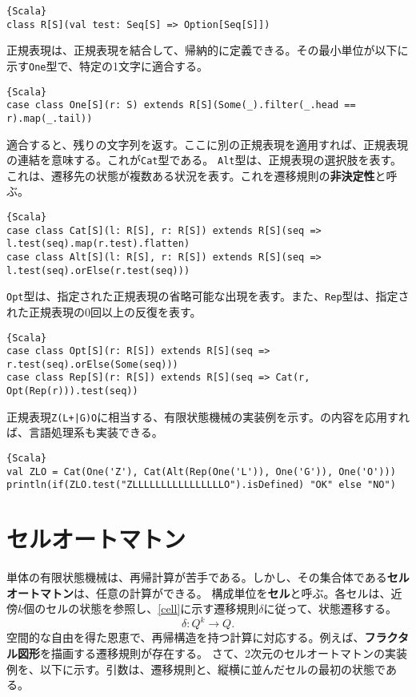 \documentclass[10pt,a4paper]{book}
\begin{document}
\begin{Verbatim}{Scala}
class R[S](val test: Seq[S] => Option[Seq[S]])
\end{Verbatim}

正規表現は、正規表現を結合して、帰納的に定義できる。その最小単位が以下に示す\texttt{One}型で、特定の1文字に適合する。

\begin{Verbatim}{Scala}
case class One[S](r: S) extends R[S](Some(_).filter(_.head == r).map(_.tail))
\end{Verbatim}

適合すると、残りの文字列を返す。ここに別の正規表現を適用すれば、正規表現の連結を意味する。これが\texttt{Cat}型である。
\texttt{Alt}型は、正規表現の選択肢を表す。これは、遷移先の状態が複数ある状況を表す。これを遷移規則の\textbf{非決定性}と呼ぶ。

\begin{Verbatim}{Scala}
case class Cat[S](l: R[S], r: R[S]) extends R[S](seq => l.test(seq).map(r.test).flatten)
case class Alt[S](l: R[S], r: R[S]) extends R[S](seq => l.test(seq).orElse(r.test(seq)))
\end{Verbatim}

\texttt{Opt}型は、指定された正規表現の省略可能な出現を表す。また、\texttt{Rep}型は、指定された正規表現の0回以上の反復を表す。

\begin{Verbatim}{Scala}
case class Opt[S](r: R[S]) extends R[S](seq => r.test(seq).orElse(Some(seq)))
case class Rep[S](r: R[S]) extends R[S](seq => Cat(r, Opt(Rep(r))).test(seq))
\end{Verbatim}

正規表現\texttt{Z(L+|G)O}に相当する、有限状態機械の実装例を示す。の内容を応用すれば、言語処理系も実装できる。

\begin{Verbatim}{Scala}
val ZLO = Cat(One('Z'), Cat(Alt(Rep(One('L')), One('G')), One('O')))
println(if(ZLO.test("ZLLLLLLLLLLLLLLLLO").isDefined) "OK" else "NO")
\end{Verbatim}

\section{セルオートマトン\label{sect:cell}}

単体の有限状態機械は、再帰計算が苦手である。しかし、その集合体である\textbf{セルオートマトン}は、任意の計算ができる。
構成単位を\textbf{セル}と呼ぶ。各セルは、近傍$k$個のセルの状態を参照し、\eqref{cell}に示す遷移規則$\delta$に従って、状態遷移する。
%
\begin{equation}
\label{eq:cell}
\delta: Q^k \to Q.
\end{equation}
%
空間的な自由を得た恩恵で、再帰構造を持つ計算に対応する。例えば、\textbf{フラクタル図形}を描画する遷移規則が存在する。
さて、2次元のセルオートマトンの実装例を、以下に示す。引数は、遷移規則と、縦横に並んだセルの最初の状態である。
\end{document}

